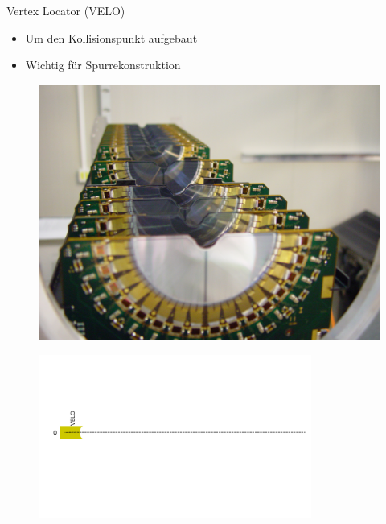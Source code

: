 \begin{frame}{Vertex Locator (VELO)}
    \begin{minipage}{0.58\textwidth}
        \begin{itemize}
        \item Um den Kollisionspunkt aufgebaut
        \item Wichtig für Spurrekonstruktion
    \end{itemize}
    \end{minipage}\hfill
    \begin{minipage}{0.38\textwidth}
        \begin{figure}[h]
        \centering
        \includegraphics[height=3 cm]{Figures Introductory Lecture/LHCb Detector/LHCb_VELO.jpg}%
        \end{figure}
    \end{minipage}
    \vspace{-1cm}
    \begin{figure}[h]
    \centering
    \includegraphics[width=0.8\textwidth]{Figures Introductory Lecture/LHCb Detector/LHCb_1_DE.png}
    \end{figure}
\end{frame}
